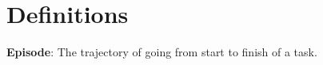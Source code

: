 \documentclass[12pt,letterpaper, onecolumn]{exam}
\newcommand{\highlight}[1]{\textbf{\textcolor{highlight_color}{#1}}}
\begin{document}
\section{Definitions}
\highlight{Episode}: The trajectory of going from start to finish of a task.




    
    
    

    
    
    

\newpage
\printbibliography[title={References}]
\end{document}
